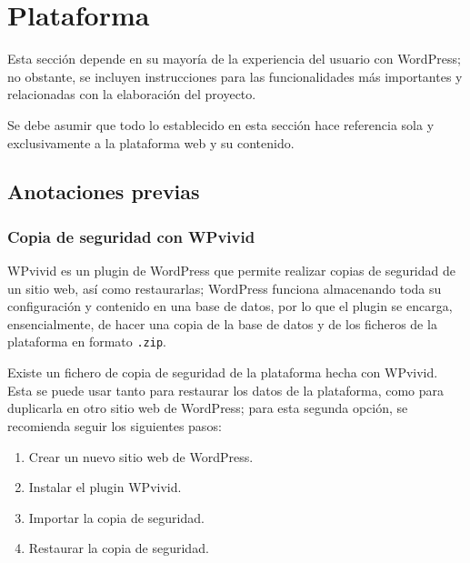     \section{Plataforma}

        Esta sección depende en su mayoría de la experiencia del usuario con WordPress; no obstante, se incluyen instrucciones para las funcionalidades más importantes y relacionadas con la elaboración del proyecto.

        Se debe asumir que todo lo establecido en esta sección hace referencia sola y exclusivamente a la plataforma web y su contenido.

        \subsection{Anotaciones previas}

            \subsubsection{Copia de seguridad con WPvivid}

                WPvivid \cite{wpvivid} es un plugin de WordPress que permite realizar copias de seguridad de un sitio web, así como restaurarlas; WordPress funciona almacenando toda su configuración y contenido en una base de datos, por lo que el plugin se encarga, ensencialmente, de hacer una copia de la base de datos y de los ficheros de la plataforma en formato \texttt{.zip}.

                Existe un fichero de copia de seguridad de la plataforma hecha con WPvivid. Esta se puede usar tanto para restaurar los datos de la plataforma, como para duplicarla en otro sitio web de WordPress; para esta segunda opción, se recomienda seguir los siguientes pasos:
                
                \begin{enumerate}
                    \item Crear un nuevo sitio web de WordPress.
                    \item Instalar el plugin WPvivid.
                    \item Importar la copia de seguridad.
                    \item Restaurar la copia de seguridad.
                \end{enumerate}

